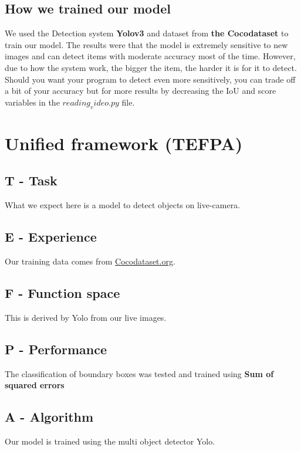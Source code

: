 \documentclass{article}
\begin{document}
\subsection{How we trained our model}
\tab We used the Detection system \textbf{Yolov3} and dataset from \textbf{the Cocodataset} to train our model. The results were that the model is extremely sensitive to new images and can detect items with moderate accuracy most of the time. However, due to how the system work, the bigger the item, the harder it is for it to detect.\\
Should you want your program to detect even more sensitively, you can trade off a bit of your accuracy but for more results by decreasing the IoU and score variables in the \textbf{$reading_video.py$} file.

\section{Unified framework (TEFPA)}
\subsection{T - Task}
What we expect here is a model to detect objects on live-camera.
\subsection{E - Experience}
Our training data comes from \url{Cocodataset.org}.
\subsection{F - Function space}
This is derived by Yolo from our live images.
\subsection{P - Performance}
The classification of boundary boxes was tested and trained using \textbf{Sum of squared errors}
\subsection{A - Algorithm}
Our model is trained using the multi object detector Yolo.
\end{document}
